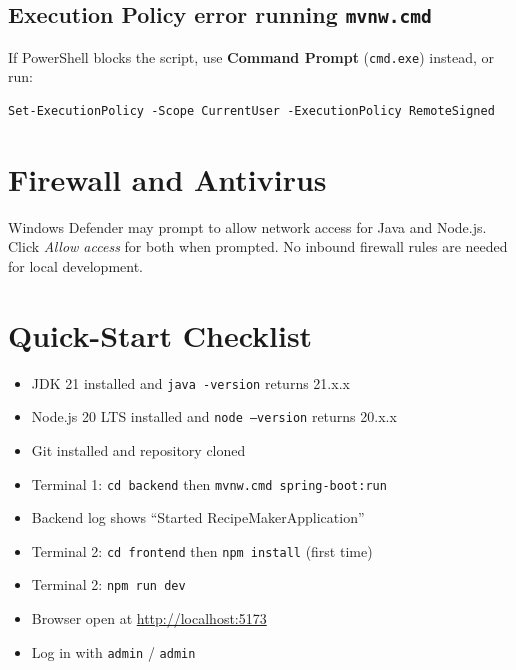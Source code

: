 \documentclass[12pt,a4paper]{article}
\begin{document}
\subsection{Execution Policy error running \texttt{mvnw.cmd}}
If PowerShell blocks the script, use \textbf{Command Prompt} (\texttt{cmd.exe})
instead, or run:
\begin{lstlisting}
Set-ExecutionPolicy -Scope CurrentUser -ExecutionPolicy RemoteSigned
\end{lstlisting}

\section{Firewall and Antivirus}
Windows Defender may prompt to allow network access for Java and Node.js.
Click \emph{Allow access} for both when prompted.  No inbound firewall rules
are needed for local development.

\section{Quick-Start Checklist}

\begin{itemize}
  \item[$\square$] JDK 21 installed and \texttt{java -version} returns 21.x.x
  \item[$\square$] Node.js 20 LTS installed and \texttt{node --version} returns 20.x.x
  \item[$\square$] Git installed and repository cloned
  \item[$\square$] Terminal 1: \texttt{cd backend} then \texttt{mvnw.cmd spring-boot:run}
  \item[$\square$] Backend log shows ``Started RecipeMakerApplication''
  \item[$\square$] Terminal 2: \texttt{cd frontend} then \texttt{npm install} (first time)
  \item[$\square$] Terminal 2: \texttt{npm run dev}
  \item[$\square$] Browser open at \url{http://localhost:5173}
  \item[$\square$] Log in with \texttt{admin} / \texttt{admin}
\end{itemize}
\end{document}
